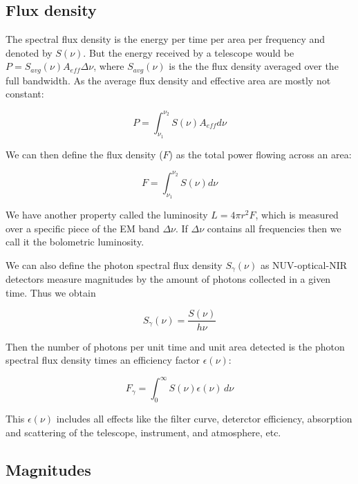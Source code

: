 \documentclass[a4paper]{article}
\begin{document}
\subsection{Flux density}
The spectral flux density is the energy per time per area per frequency and denoted by $S(\nu)$. But the energy received by a telescope would be $P=S_{avg}(\nu)A_{eff}\Delta\nu$, where $S_{avg}(\nu)$ is the the flux density averaged over the full bandwidth. As the average flux density and effective area are mostly not constant:

\begin{equation}
    P=\int_{\nu_1}^{\nu_2}S(\nu)A_{eff}d\nu
\end{equation}

We can then define the flux density ($F$) as the total power flowing across an area:

\begin{equation}
    F=\int_{\nu_1}^{\nu_2}S(\nu)d\nu
\end{equation}

We have another property called the luminosity $L=4\pi r^2F$, which is measured over a specific piece of the EM band $\Delta\nu$. If $\Delta\nu$ contains all frequencies then we call it the bolometric luminosity.

\bigskip

We can also define the photon spectral flux density $S_{\gamma}(\nu)$ as NUV-optical-NIR detectors measure magnitudes by the amount of photons collected in a given time. Thus we obtain

\begin{equation}
    S_{\gamma}(\nu)=\frac{S(\nu)}{h\nu}
\end{equation}

Then the number of photons per unit time and unit area detected is the photon spectral flux density times an efficiency factor $\epsilon(\nu)$:

\begin{equation}
    F_\gamma=\int_{0}^{\infty}S(\nu)\epsilon(\nu)\,d\nu
\end{equation}

This $\epsilon(\nu)$ includes all effects like the filter curve, deterctor efficiency, absorption and scattering of the telescope, instrument, and atmosphere, etc.

\subsection{Magnitudes}
\end{document}
